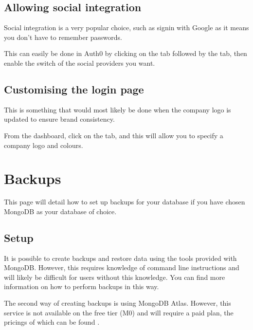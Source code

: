 \documentclass[letterpaper,10pt,english]{sphinxmanual}
\begin{document}
\subsection{Allowing social integration}
\label{\detokenize{docs/Expansion/auth-expansion:allowing-social-integration}}
Social integration is a very popular choice, such as signin with Google
as it means you don’t have to remember passwords.

This can easily be done in Auth0 by clicking on the  tab
followed by the  tab, then enable the switch of the social
providers you want.


\subsection{Customising the login page}
\label{\detokenize{docs/Expansion/auth-expansion:customising-the-login-page}}
This is something that would most likely be done when the company logo
is updated to ensure brand consistency.

From the dashboard, click on the  tab, and this will
allow you to specify a company logo and colours.


\section{Backups}
\label{\detokenize{docs/Expansion/backups:backups}}\label{\detokenize{docs/Expansion/backups::doc}}
This page will detail how to set up backups for your database if you
have chosen MongoDB as your database of choice.


\subsection{Setup}
\label{\detokenize{docs/Expansion/backups:setup}}
It is possible to create backups and restore data using the tools
provided with MongoDB. However, this requires knowledge of command line
instructions and will likely be difficult for users without this
knowledge. You can find more information
on how to perform backups in this way.

The second way of creating backups is using MongoDB Atlas. However, this
service is not available on the free tier (M0) and will require a paid
plan, the pricings of which can be found
.
\end{document}
